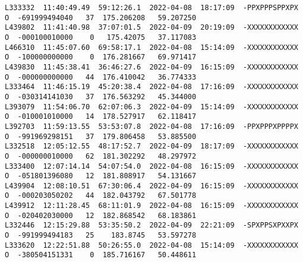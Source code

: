 \documentclass[12pt]{article}
\begin{document}
\begin{verbatim}
L333332  11:40:49.49  59:12:26.1  2022-04-08  18:17:09  -PPXPPPSPPXPX  O  -691999494040   37  175.206208   59.207250
L439802  11:41:40.98  37:07:01.5  2022-04-09  20:19:09  -XXXXXXXXXXXX  O  -000100010000    0   175.42075   37.117083
L466310  11:45:07.60  69:58:17.1  2022-04-08  15:14:09  -XXXXXXXXXXXX  O  -100000000000    0  176.281667   69.971417
L439830  11:45:38.41  36:46:27.6  2022-04-09  16:15:09  -XXXXXXXXXXXX  O  -000000000000   44  176.410042   36.774333
L333464  11:46:15.19  45:20:38.4  2022-04-08  17:16:09  -XXXXXXXXXXXX  O  -030314141030   37  176.563292   45.344000
L393079  11:54:06.70  62:07:06.3  2022-04-09  15:14:09  -XXXXXXXXXXXX  O  -010001010000   14  178.527917   62.118417
L392703  11:59:13.55  53:53:07.8  2022-04-08  17:16:09  -PPXPPPXPPPPX  O  -991969298151   37  179.806458   53.885500
L332518  12:05:12.55  48:17:52.7  2022-04-09  18:17:09  -XXXXXXXXXXXX  O  -000000010000   62  181.302292   48.297972
L333400  12:07:14.14  54:07:54.0  2022-04-08  16:15:09  -XXXXXXXXXXXX  O  -051801396080   12  181.808917   54.131667
L439904  12:08:10.51  67:30:06.4  2022-04-09  16:15:09  -XXXXXXXXXXXX  O  -000203050202   44  182.043792   67.501778
L439912  12:11:28.45  68:11:01.9  2022-04-08  16:15:09  -XXXXXXXXXXXX  O  -020402030000   12  182.868542   68.183861
L332446  12:15:29.88  53:35:50.2  2022-04-09  22:21:09  -SPXPPSXPXXPX  O  -991999494183   25    183.8745   53.597278
L333620  12:22:51.88  50:26:55.0  2022-04-08  15:14:09  -XXXXXXXXXXXX  O  -380504151331    0  185.716167   50.448611
\end{verbatim}
\end{document}
